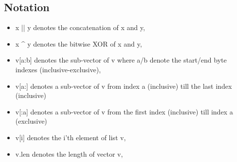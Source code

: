 \subsection{Notation}\label{sec:notation}
\begin{itemize}
    \item x || y denotes the concatenation of x and y,
    \item x \^{} y denotes the bitwise XOR of x and y,
    \item v[a:b] denotes the sub-vector of v where a/b denote the start/end byte indexes (inclusive-exclusive),
    \item v[a:] denotes a sub-vector of v from index a (inclusive) till the last index (inclusive)
    \item v[:a] denotes a sub-vector of v from the first index (inclusive) till index a (exclusive)
    \item v[i] denotes the i'th element of list v,
    \item v.len denotes the length of vector v,
\end{itemize}

